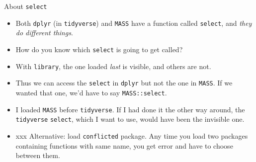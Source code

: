 \documentclass[ignorenonframetext,]{beamer}
\begin{document}
\begin{frame}[fragile]{About \texttt{select}}
\protect\hypertarget{about-select}{}

\begin{itemize}
\item
  Both \texttt{dplyr} (in \texttt{tidyverse}) and \texttt{MASS} have a
  function called \texttt{select}, and \emph{they do
  different things}.
\item
  How do you know which \texttt{select} is going to get called?
\item
  With \texttt{library}, the one loaded \emph{last} is visible, and
  others are not.
\item
  Thus we can access the \texttt{select} in \texttt{dplyr} but not the
  one in \texttt{MASS}. If we wanted that one, we'd have to say
  \texttt{MASS::select}.
\item
  I loaded \texttt{MASS} before \texttt{tidyverse}. If I had done it the
  other way around, the \texttt{tidyverse} \texttt{select}, which I want
  to use, would have been the invisible one.
\item
  xxx Alternative: load \texttt{conflicted} package. Any time you load
  two packages containing functions with same name, you get error and
  have to choose between them.
\end{itemize}

\end{frame}
\end{document}
